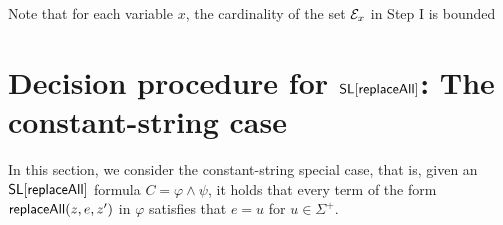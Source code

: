 \smallskip

Note that for each variable $x$, the cardinality of the set $\mathcal{E}_x$ in Step I is bounded 





\begin{example}
\end{example}



\section{Decision procedure for $\mathsf{SL}[\mathsf{replaceAll}]$: The constant-string case}

In this section, we consider the constant-string special case, that is, given an $\mathsf{SL}[\mathsf{replaceAll}]$ formula $C = \varphi \wedge \psi$, it holds that every term of the form $\mathsf{replaceAll}(z, e, z')$ in $\varphi$ satisfies that $e=u$ for $u \in \Sigma^+$.

